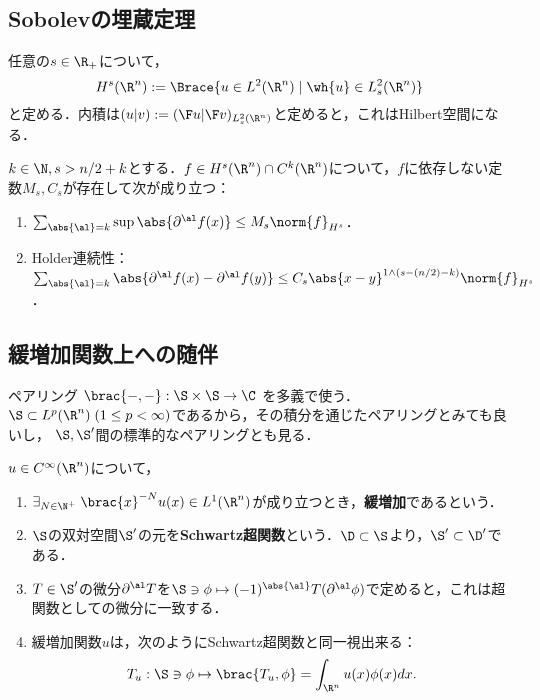 \documentclass[uplatex, dvipdfmx]{jsreport}
\begin{document}
\subsection{Sobolevの埋蔵定理}

\begin{definition}
    任意の$s\in\R_+$について，
    \[H^s(\R^n):=\Brace{u\in L^2(\R^n)\mid\wh{u}\in L^2_s(\R^n)}\]
    と定める．内積は$(u|v):=(\F u|\F v)_{L^2_s(\R^n)}$と定めると，これはHilbert空間になる．
\end{definition}

\begin{theorem}
    $k\in\N,s>n/2+k$とする．$f\in H^s(\R^n)\cap C^k(\R^n)$について，$f$に依存しない定数$M_s,C_s$が存在して次が成り立つ：
    \begin{enumerate}
        \item $\sum_{\abs{\al}=k}\sup\abs{\partial^\al f(x)}\le M_s\norm{f}_{H^s}$．
        \item Holder連続性：$\sum_{\abs{\al}=k}\abs{\partial^\al f(x)-\partial^\al f(y)}\le C_s\abs{x-y}^{1\land(s-(n/2)-k)}\norm{f}_{H^s}$．
    \end{enumerate}
\end{theorem}

\subsection{緩増加関数上への随伴}

\begin{tcolorbox}[colframe=ForestGreen, colback=ForestGreen!10!white,breakable,colbacktitle=ForestGreen!40!white,coltitle=black,fonttitle=\bfseries\sffamily,
title=]
    ペアリング
    $\brac{-,-}:\S\times\S\to\C$
    を多義で使う．$\S\subset L^p(\R^n)\;(1\le p<\infty)$であるから，その積分を通じたペアリングとみても良いし，
    $\S,\S'$間の標準的なペアリングとも見る．
\end{tcolorbox}

\begin{definition}
    $u\in C^\infty(\R^n)$について，
    \begin{enumerate}
        \item $\exists_{N\in\N^+}\;\brac{x}^{-N}u(x)\in L^1(\R^n)$が成り立つとき，\textbf{緩増加}であるという．
        \item $\S$の双対空間$\S'$の元を\textbf{Schwartz超関数}という．$\D\subset\S$より，$\S'\subset\D'$である．
        \item $T\in\S'$の微分$\partial^\al T$を$\S\ni\phi\mapsto(-1)^{\abs{\al}}T(\partial^\al\phi)$で定めると，これは超関数としての微分に一致する．
        \item 緩増加関数$u$は，次のようにSchwartz超関数と同一視出来る：
        \[T_u:\S\ni\phi\mapsto\brac{T_u,\phi}=\int_{\R^n}u(x)\phi(x)dx.\]
    \end{enumerate}
\end{definition}
\end{document}

